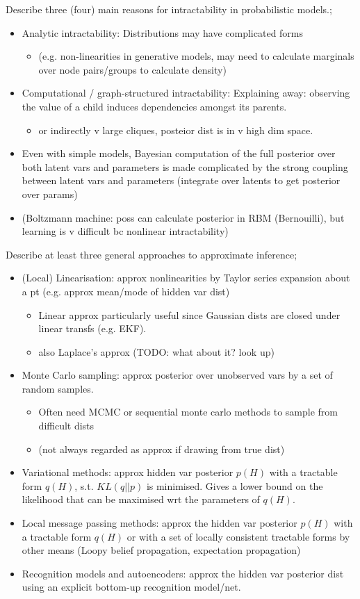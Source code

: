 \documentclass{article}
\begin{document}
Describe three (four) main reasons for intractability in probabilistic models.; \begin{itemize} \item Analytic intractability: Distributions may have complicated forms \begin{itemize} \item (e.g. non-linearities in generative models, may need to calculate marginals over node pairs/groups to calculate density) \end{itemize} \item Computational / graph-structured intractability: Explaining away: observing the value of a child induces dependencies amongst its parents. \begin{itemize} \item or indirectly v large cliques, posteior dist is in v high dim space. \end{itemize} \item Even with simple models, Bayesian computation of the full posterior over both latent vars and parameters is made complicated by the strong coupling between latent vars and parameters (integrate over latents to get posterior over params) \item (Boltzmann machine: poss can calculate posterior in RBM (Bernouilli), but learning is v difficult bc nonlinear intractability) \end{itemize}

Describe at least three general approaches to approximate inference; \begin{itemize} \item (Local) Linearisation: approx nonlinearities by Taylor series expansion about a pt (e.g. approx mean/mode of hidden var dist) \begin{itemize} \item Linear approx particularly useful since Gaussian dists are closed under linear transfs (e.g. EKF). \item also Laplace's approx (TODO: what about it? look up) \end{itemize} \item Monte Carlo sampling: approx posterior over unobserved vars by a set of random samples. \begin{itemize} \item Often need MCMC or sequential monte carlo methods to sample from difficult dists \item (not always regarded as approx if drawing from true dist) \end{itemize} \item Variational methods: approx hidden var posterior $p(H)$ with a tractable form $q(H)$, s.t. $KL(q||p)$ is minimised. Gives a lower bound on the likelihood that can be maximised wrt the parameters of $q(H)$. \item Local message passing methods: approx the hidden var posterior $p(H)$ with a tractable form $q(H)$ or with a set of locally consistent tractable forms by other means (Loopy belief propagation, expectation propagation) \item Recognition models and autoencoders: approx the hidden var posterior dist using an explicit bottom-up recognition model/net. \end{itemize}
\end{document}
